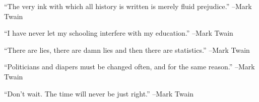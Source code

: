 \documentclass{article}%
\begin{document}
\linebreak%
\vspace{1mm}%
\begin{minipage}{\textwidth}%
\flushleft%
“The very ink with which all history is written is merely fluid prejudice.”%
\linebreak%
\vspace{1mm}%
–Mark Twain%
\linebreak%
\vspace{1mm}%
\end{minipage}%
\linebreak%
\vspace{1mm}%
\begin{minipage}{\textwidth}%
\flushleft%
“I have never let my schooling interfere with my education.”%
\linebreak%
\vspace{1mm}%
–Mark Twain%
\linebreak%
\vspace{1mm}%
\end{minipage}%
\linebreak%
\vspace{1mm}%
\begin{minipage}{\textwidth}%
\flushleft%
“There are lies, there are damn lies and then there are statistics.”%
\linebreak%
\vspace{1mm}%
–Mark Twain%
\linebreak%
\vspace{1mm}%
\end{minipage}%
\linebreak%
\vspace{1mm}%
\begin{minipage}{\textwidth}%
\flushleft%
“Politicians and diapers must be changed often, and for the same reason.”%
\linebreak%
\vspace{1mm}%
–Mark Twain%
\linebreak%
\vspace{1mm}%
\end{minipage}%
\linebreak%
\vspace{1mm}%
\begin{minipage}{\textwidth}%
\flushleft%
“Don't wait. The time will never be just right.”%
\linebreak%
\vspace{1mm}%
–Mark Twain%
\linebreak%
\vspace{1mm}%
\end{minipage}%
\end{document}
